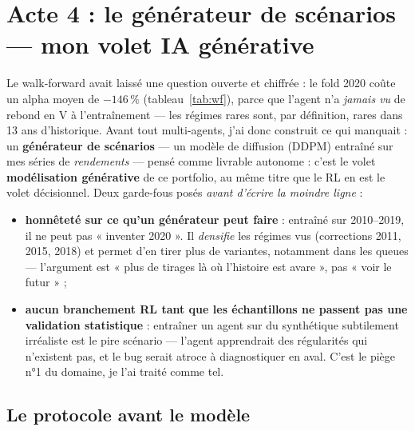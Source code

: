 \documentclass[11pt,a4paper]{article}
\begin{document}
\section{Acte 4 : le générateur de scénarios --- mon volet IA générative}
\label{sec:diffusion}

Le walk-forward avait laissé une question ouverte et chiffrée : le fold 2020 coûte un
alpha moyen de $-146\,\%$ (tableau~\ref{tab:wf}), parce que l'agent n'a \emph{jamais vu}
de rebond en V à l'entraînement --- les régimes rares sont, par définition, rares dans
13 ans d'historique. Avant tout multi-agents, j'ai donc construit ce qui manquait :
un \textbf{générateur de scénarios} --- un modèle de diffusion (DDPM) entraîné sur mes
séries de \emph{rendements} --- pensé comme livrable autonome : c'est le volet
\textbf{modélisation générative} de ce portfolio, au même titre que le RL en est le
volet décisionnel. Deux garde-fous posés \emph{avant d'écrire la moindre ligne} :
\begin{itemize}[itemsep=2pt]
  \item \textbf{honnêteté sur ce qu'un générateur peut faire} : entraîné sur
        2010--2019, il ne peut pas « inventer 2020 ». Il \emph{densifie} les régimes
        vus (corrections 2011, 2015, 2018) et permet d'en tirer plus de variantes,
        notamment dans les queues --- l'argument est « plus de tirages là où
        l'histoire est avare », pas « voir le futur » ;
  \item \textbf{aucun branchement RL tant que les échantillons ne passent pas une
        validation statistique} : entraîner un agent sur du synthétique subtilement
        irréaliste est le pire scénario --- l'agent apprendrait des régularités qui
        n'existent pas, et le bug serait atroce à diagnostiquer en aval. C'est le
        piège n°1 du domaine, je l'ai traité comme tel.
\end{itemize}

\subsection{Le protocole avant le modèle}
\end{document}
